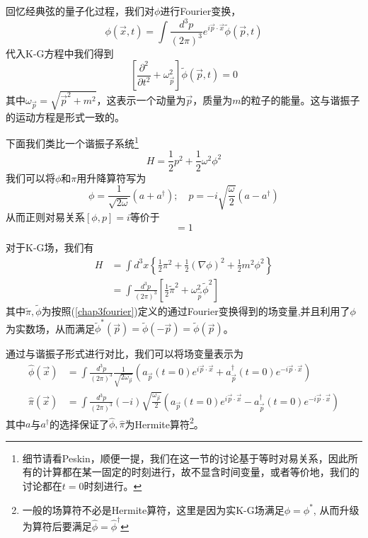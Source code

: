 回忆经典弦的量子化过程，我们对$\phi$进行Fourier变换，
\begin{equation}
\label{chap3fourier}
    \phi(\vec{x},t)=\int \frac{d^{3}p}{(2\pi)^{3}}e^{i\vec{p}\cdot\vec{x}}\tilde{\phi}(\vec{p},t)
\end{equation}
代入K-G方程中我们得到
\begin{equation}
\label{fourkg}
\left[ \frac{\partial^{2}}{\partial t^{2}}+\omega^{2}_{\vec{p}}\right]\tilde{\phi}(\vec{p},t)=0
\end{equation}
其中$\omega_{\vec{p}}=\sqrt{\vec{p}^{2}+m^{2}}$，这表示一个动量为$\vec{p}$，质量为$m$的粒子的能量。这与谐振子的运动方程是形式一致的。

下面我们类比一个谐振子系统\footnote{细节请看Peskin，顺便一提，我们在这一节的讨论基于等时对易关系，因此所有的计算都在某一固定的时刻进行，故不显含时间变量，或者等价地，我们的讨论都在$t=0$时刻进行。}
\begin{equation}
    H=\frac{1}{2}p^{2}+\frac{1}{2}\omega^{2}\phi^{2}
\end{equation}
我们可以将$\phi$和$\pi$用升降算符写为
\begin{equation}
\phi=\frac{1}{\sqrt{2\omega}}(a+a^{\dagger});\quad p=-i\sqrt{\frac{\omega}{2}}(a-a^{\dagger})
\end{equation}
从而正则对易关系$[\phi,p]=i$等价于
\begin{equation}
    [a,a^{\dagger}]=1
\end{equation}

对于K-G场，我们有
\begin{equation}
\begin{aligned}
H&=\int d^{3}x\left\{\frac{1}{2}\pi^{2}+\frac{1}{2}(\nabla \phi)^{2}+\frac{1}{2}m^{2}\phi^{2}\right\}\\
&=\int \frac{d^{3}p}{(2\pi)^{3}}\left[\frac{1}{2}\tilde{\pi}^{2}+\omega_{\vec{p}}^{2}\tilde{\phi}^{2}\right]
\end{aligned}
\end{equation}
其中$\tilde{\pi},\tilde{\phi}$为按照(\ref{chap3fourier})定义的通过Fourier变换得到的场变量,并且利用了$\phi$为实数场，从而满足$\tilde{\phi}^{*}(\vec{p})=\tilde{\phi}(-\vec{p})=\tilde{\phi}(\vec{p})$。

通过与谐振子形式进行对比，我们可以将场变量表示为
\begin{equation}
\label{chap3kgphi}
\begin{aligned}
    \hat{\phi}(\vec{x})&=\int \frac{d^{3}p}{(2\pi)^{3}}\frac{1}{\sqrt{2\omega_{\vec{p}}}}\left(a_{\vec{p}}(t=0)e^{i\vec{p}\cdot\vec{x}}+a^{\dagger}_{\vec{p}}(t=0)e^{-i\vec{p}\cdot\vec{x}}\right)\\
    \hat{\pi}(\vec{x})&=\int \frac{d^{3}p}{(2\pi)^{3}}(-i)\sqrt{\frac{\omega_{\vec{p}}}{2}}\left(a_{\vec{p}}(t=0)e^{i\vec{p}\cdot\vec{x}}-a^{\dagger}_{\vec{p}}(t=0)e^{-i\vec{p}\cdot\vec{x}}\right)
\end{aligned}
\end{equation}
其中$a$与$a^{\dagger}$的选择保证了$\hat{\phi},\hat{\pi}$为Hermite算符\footnote{一般的场算符不必是Hermite算符，这里是因为实K-G场满足$\phi=\phi^{*}$, 从而升级为算符后要满足$\hat{\phi}=\hat{\phi}^{\dagger}$}。

